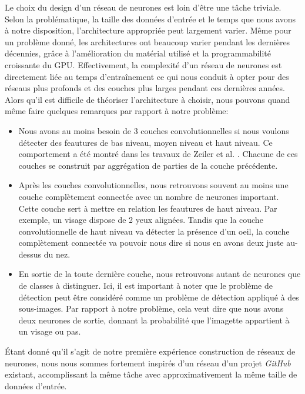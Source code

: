 \documentclass[a4paper,11pt]{article}
\begin{document}
    Le choix du design d'un réseau de neurones est loin d'être une tâche triviale.
    Selon la problématique, la taille des données d'entrée et le temps que nous avons à notre disposition, l'architecture appropriée peut largement varier.
    Même pour un problème donné, les architectures ont beaucoup varier pendant les dernières décennies, grâce à l'amélioration du matérial utilisé et la programmabilité croissante du GPU.
    Effectivement, la complexité d'un réseau de neurones est directement liée au temps d'entraînement ce qui nous conduit à opter pour des réseaus plus profonds et des couches plus larges pendant ces dernières années.
    \\
    Alors qu'il est difficile de théoriser l'architecture à choisir, nous pouvons quand même faire quelques remarques par rapport à notre problème:
    \begin{itemize}
        \item
            Nous avons au moins besoin de 3 couches convolutionnelles si nous voulons détecter des feautures de bas niveau, moyen niveau et haut niveau.
            Ce comportement a été montré dans les travaux de Zeiler et al. \cite{zeiler2014visualizing}.
            Chacune de ces couches se construit par aggrégation de parties de la couche précédente.
        \item
            Après les couches convolutionnelles, nous retrouvons souvent au moins une couche complètement connectée avec un nombre de neurones important.
            Cette couche sert à mettre en relation les feautures de haut niveau. 
            Par exemple, un visage dispose de 2 yeux alignées.
            Tandis que la couche convolutionnelle de haut niveau va détecter la présence d'un oeil, la couche complètement connectée va pouvoir nous dire si nous en avons deux juste au-dessus du nez.
        \item
            En sortie de la toute dernière couche, nous retrouvons autant de neurones que de classes à distinguer.
            Ici, il est important à noter que le problème de détection peut être considéré comme un problème de détection appliqué à des sous-images.
            Par rapport à notre problème, cela veut dire que nous avons deux neurones de sortie, donnant la probabilité que l'imagette appartient à un visage ou pas.
    \end{itemize}

    Étant donné qu'il s'agit de notre première expérience construction de réseaux de neurones, nous nous sommes fortement inspirés d'un réseau d'un projet \textit{GitHub} \cite{face_detect} existant, accomplissant la même tâche avec approximativement la même taille de données d'entrée.
\end{document}
